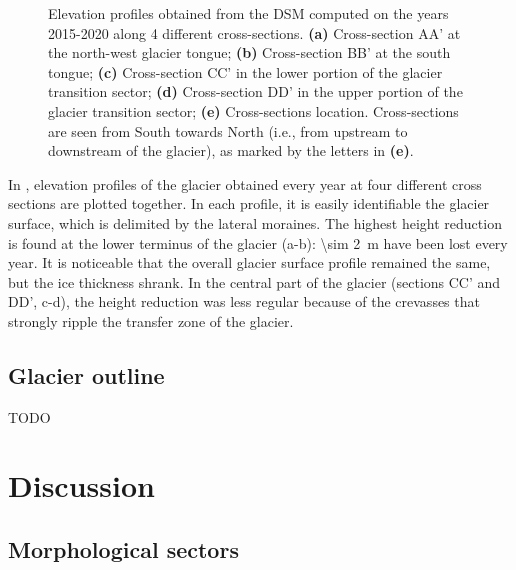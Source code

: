 \begin{figure}
{  }
    \caption{Elevation profiles obtained from the DSM computed on the years 2015-2020 along 4 different cross-sections. \textbf{(a)} Cross-section AA' at the north-west glacier tongue; \textbf{(b)} Cross-section BB' at the south tongue; \textbf{(c)} Cross-section CC' in the lower portion of the glacier transition sector; \textbf{(d)} Cross-section DD' in the upper portion of the glacier transition sector; \textbf{(e)} Cross-sections location. Cross-sections are seen from South towards North (i.e., from upstream to downstream of the glacier), as marked by the letters in \textbf{(e)}.}
    \label{fig:3:profiles}
\end{figure}

In , elevation profiles of the glacier obtained every year at four different cross sections are plotted together.
In each profile, it is easily identifiable the glacier surface, which is delimited by the lateral moraines.
The highest height reduction is found at the lower terminus of the glacier (a-b): \qty{\sim 2}{\meter} have been lost every year. 
It is noticeable that the overall glacier surface profile remained the same, but the ice thickness shrank.
In the central part of the glacier (sections CC' and DD', c-d), the height reduction was less regular because of the crevasses that strongly ripple the transfer zone of the glacier.	

\subsection{Glacier outline}\label{sec:3:res:outline}

{\color{red} TODO}

\section{Discussion}\label{sec:3:discussion}

\subsection{Morphological sectors}\label{sec:3:discussion:sectors}

